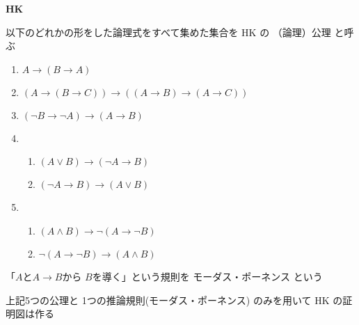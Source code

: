 \documentclass[12pt,b5paper]{ltjsarticle}
\begin{document}
\hrulefill
\textbf{HK}
\hrulefill

以下のどれかの形をした論理式をすべて集めた集合を
HK の （論理）公理
と呼ぶ
\begin{enumerate}
 \item $A \to (B \to A)$
 \item $(A \to (B \to C )) \to ((A \to B) \to (A \to C))$
 \item $(\neg B \to \neg A) \to (A \to B)$
 \item
      \begin{enumerate}
       \item $(A \lor B) \to (\neg A \to B)$
       \item $(\neg A \to B) \to (A \lor B)$
      \end{enumerate}
 \item
      \begin{enumerate}
       \item $(A \land B) \to \neg (A \to \neg B)$
       \item $\neg (A \to \neg B) \to (A \land B)$
      \end{enumerate}
\end{enumerate}

「$A$と$A \to B$から $B$を導く」という規則を
モーダス・ポーネンス
という

上記5つの公理と
1つの推論規則(モーダス・ポーネンス)
のみを用いて
HK の証明図は作る

\hrulefill
\end{document}
